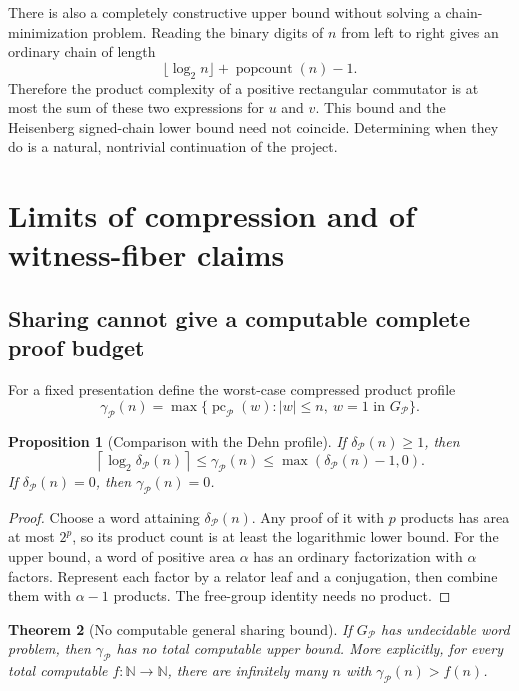 \documentclass[11pt,letterpaper]{article}
\newtheorem{theorem}{Theorem}[section]
\newtheorem{proposition}[theorem]{Proposition}
\theoremstyle{definition}
\theoremstyle{remark}
\newcommand{\N}{\mathbb N}
\newcommand{\Pp}{\mathcal P}
\newcommand{\pc}{\operatorname{pc}}
\begin{document}
There is also a completely constructive upper bound without solving a chain-minimization problem. Reading the binary digits of $n$ from left to right gives an ordinary chain of length
\[
 \lfloor\log_2n\rfloor+\operatorname{popcount}(n)-1.
\]
Therefore the product complexity of a positive rectangular commutator is at most the sum of these two expressions for $u$ and $v$. This bound and the Heisenberg signed-chain lower bound need not coincide. Determining when they do is a natural, nontrivial continuation of the project.

\section{Limits of compression and of witness-fiber claims}\label{gts:vk:sec:fold}

\subsection{Sharing cannot give a computable complete proof budget}

For a fixed presentation define the worst-case compressed product profile
\begin{equation}\label{gts:vk:eq:gamma}
 \gamma_{\Pp}(n)=\max\{\pc_{\Pp}(w):|w|\leq n,\ w=1\text{ in }G_{\Pp}\}.
\end{equation}

\begin{proposition}[Comparison with the Dehn profile]\label{gts:vk:prop:gamma}
If $\delta_{\Pp}(n)\geq1$, then
\begin{equation}\label{gts:vk:eq:gamma-bounds}
 \left\lceil\log_2\delta_{\Pp}(n)\right\rceil
 \leq\gamma_{\Pp}(n)
 \leq\max(\delta_{\Pp}(n)-1,0).
\end{equation}
If $\delta_{\Pp}(n)=0$, then $\gamma_{\Pp}(n)=0$.
\end{proposition}

\begin{proof}
Choose a word attaining $\delta_{\Pp}(n)$. Any proof of it with $p$ products has area at most $2^p$, so its product count is at least the logarithmic lower bound. For the upper bound, a word of positive area $\alpha$ has an ordinary factorization with $\alpha$ factors. Represent each factor by a relator leaf and a conjugation, then combine them with $\alpha-1$ products. The free-group identity needs no product.
\end{proof}

\begin{theorem}[No computable general sharing bound]\label{gts:vk:thm:no-sharing-cutoff}
If $G_{\Pp}$ has undecidable word problem, then $\gamma_{\Pp}$ has no total computable upper bound. More explicitly, for every total computable $f:\N\to\N$, there are infinitely many $n$ with $\gamma_{\Pp}(n)>f(n)$.
\end{theorem}
\end{document}
